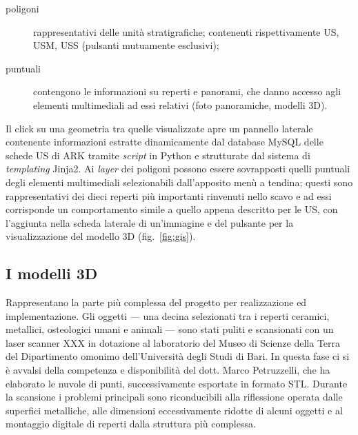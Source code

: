 \documentclass{paper}
\begin{document}
        \begin{description}
            \item[poligoni] rappresentativi delle unità stratigrafiche; contenenti rispettivamente US, USM, USS (pulsanti mutuamente esclusivi);
            \item[puntuali] contengono le informazioni su reperti e panorami, che danno accesso agli elementi multimediali ad essi relativi (foto panoramiche, modelli 3D).
        \end{description}

        Il click su una geometria tra quelle visualizzate apre un pannello laterale contenente informazioni estratte dinamicamente dal database MySQL delle schede US di ARK tramite \textit{script} in Python e strutturate dal sistema di \textit{templating} Jinja2. Ai \textit{layer} dei poligoni possono essere sovrapposti quelli puntuali degli elementi multimediali selezionabili dall'apposito menù a tendina; questi sono rappresentativi dei dieci reperti più importanti rinvenuti nello scavo e ad essi corrisponde un comportamento simile a quello appena descritto per le US, con l'aggiunta nella scheda laterale di un'immagine e del pulsante per la visualizzazione del modello 3D (fig.~\ref{fig:gis}).

    \subsection{I modelli 3D}

        Rappresentano la parte più complessa del progetto per realizzazione ed implementazione. Gli oggetti --- una decina selezionati tra i reperti ceramici, metallici, osteologici umani e animali --- sono stati puliti e scansionati con un laser scanner XXX in dotazione al laboratorio del Museo di Scienze della Terra del Dipartimento omonimo dell'Università degli Studi di Bari. In questa fase ci si è avvalsi della competenza e disponibilità del dott. Marco Petruzzelli, che ha elaborato le nuvole di punti, successivamente esportate in formato STL. Durante la scansione i problemi principali sono riconducibili alla riflessione operata dalle superfici metalliche, alle dimensioni eccessivamente ridotte di alcuni oggetti e al montaggio digitale di reperti dalla struttura più complessa.\\
        
\end{document}
